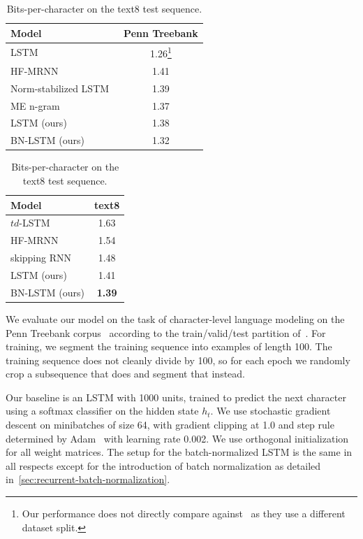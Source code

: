 \documentclass{article} %
\begin{document}
\begin{table}
  \center
\begin{minipage}[t]{6.5cm}
\begin{tabular}{@{}lc@{}}
  \toprule
  \bf Model & \bf Penn Treebank \\
  \midrule
  LSTM~\cite{graves2013generating} &  1.26\footnote{Our performance does not directly compare against~\cite{graves2013generating} as they use a different dataset split.}\\
  \midrule
  HF-MRNN~\cite{mikolov2012subword} & 1.41 \\
  Norm-stabilized LSTM~\cite{krueger} & 1.39 \\
  ME n-gram~\cite{mikolov2012subword} & 1.37 \\
  \midrule
  LSTM (ours) & 1.38 \\
  BN-LSTM (ours) & 1.32 \\
  \bottomrule
\end{tabular}
\caption{Bits-per-character on the Penn Treebank test sequence.}
\label{tab:ptb_test}
\end{minipage}
\hspace{1cm}
\begin{minipage}[t]{4.5cm}
  \begin{tabular}{@{}lc@{}}
  \toprule
  \bf Model & \bf text8 \\
  \midrule
  $td$-LSTM~\cite{zhang2016architectural} & 1.63 \\
  HF-MRNN~\cite{mikolov2012subword} & 1.54 \\
  skipping RNN~\cite{pachitariu2013regularization} & 1.48 \\
  \midrule
  LSTM (ours) &  1.41 \\
  BN-LSTM (ours) & \textbf{1.39} \\
  \bottomrule
\end{tabular}
\caption{Bits-per-character on the text8 test sequence.}
\label{tab:text8_test}
\end{minipage}
\end{table}


We evaluate our model on the task of character-level language modeling on the Penn Treebank corpus~\cite{penntreebank}
according to the train/valid/test partition of~\cite{mikolov2012subword}.
For training, we segment the training sequence into examples of length 100.
The training sequence does not cleanly divide by 100, so for each epoch we randomly crop a subsequence that does and segment that instead.

Our baseline is an LSTM with 1000 units, trained to predict the next character using a softmax classifier on the hidden state $h_t$.
We use stochastic gradient descent on minibatches of size 64,
with gradient clipping at 1.0 and step rule determined by Adam~\cite{kingma2014adam}
with learning rate 0.002.
We use orthogonal initialization for all weight matrices.
The setup for the batch-normalized LSTM is the same in all respects except for the introduction of batch normalization as detailed in~\ref{sec:recurrent-batch-normalization}.
\end{document}
